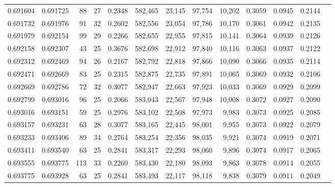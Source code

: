 \begin{tabular}{rrrrrrrrrrrrr}
0.691604 & 0.691725 &  88 &  27 &                                     0.2348 & 582,465 &  23,145 &  97,754 &  10,202 & 0.3059 & 0.0945 & 0.2144 \\
0.691732 & 0.691976 &  91 &  32 &                                     0.2602 & 582,556 &  23,054 &  97,786 &  10,170 & 0.3061 & 0.0942 & 0.2135 \\
0.691979 & 0.692154 &  99 &  29 &                                     0.2266 & 582,655 &  22,955 &  97,815 &  10,141 & 0.3064 & 0.0939 & 0.2126 \\
0.692158 & 0.692307 &  43 &  25 &                                     0.3676 & 582,698 &  22,912 &  97,840 &  10,116 & 0.3063 & 0.0937 & 0.2122 \\
0.692312 & 0.692469 &  94 &  26 &                                     0.2167 & 582,792 &  22,818 &  97,866 &  10,090 & 0.3066 & 0.0935 & 0.2114 \\
0.692471 & 0.692669 &  83 &  25 &                                     0.2315 & 582,875 &  22,735 &  97,891 &  10,065 & 0.3069 & 0.0932 & 0.2106 \\
0.692669 & 0.692786 &  72 &  32 &                                     0.3077 & 582,947 &  22,663 &  97,923 &  10,033 & 0.3069 & 0.0929 & 0.2099 \\
0.692799 & 0.693016 &  96 &  25 &                                     0.2066 & 583,043 &  22,567 &  97,948 &  10,008 & 0.3072 & 0.0927 & 0.2090 \\
0.693016 & 0.693151 &  59 &  25 &                                     0.2976 & 583,102 &  22,508 &  97,973 &   9,983 & 0.3073 & 0.0925 & 0.2085 \\
0.693157 & 0.693231 &  63 &  28 &                                     0.3077 & 583,165 &  22,445 &  98,001 &   9,955 & 0.3073 & 0.0922 & 0.2079 \\
0.693233 & 0.693406 &  89 &  34 &                                     0.2764 & 583,254 &  22,356 &  98,035 &   9,921 & 0.3074 & 0.0919 & 0.2071 \\
0.693411 & 0.693540 &  63 &  25 &                                     0.2841 & 583,317 &  22,293 &  98,060 &   9,896 & 0.3074 & 0.0917 & 0.2065 \\
0.693555 & 0.693775 & 113 &  33 &                                     0.2260 & 583,430 &  22,180 &  98,093 &   9,863 & 0.3078 & 0.0914 & 0.2055 \\
0.693775 & 0.693928 &  63 &  25 &                                     0.2841 & 583,493 &  22,117 &  98,118 &   9,838 & 0.3079 & 0.0911 & 0.2049 \\

\end{tabular}

